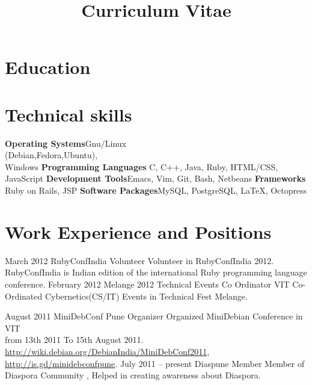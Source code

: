 \documentclass[11pt,a4paper]{moderncv}
\title{Curriculum Vitae}
\begin{document}
\maketitle

\section{Education}

\section{Technical skills}
\cvcomputer
{\textbf{Operating Systems}}{Gnu/Linux
\\(Debian,Fedora,Ubuntu), \\Windows}
{\textbf{Programming Languages}}{ C, C++, Java, Ruby, HTML/CSS, JavaScript }
\cvcomputer
{\textbf{Development Tools}}{Emacs, Vim, Git, Bash, Netbeans}
{\textbf{Frameworks}}{ Ruby on Rails, JSP}
\cvcomputer
{\textbf{Software Packages}}{MySQL, PostgreSQL, LaTeX, Octopress}
{}{}


\section{Work Experience and Positions}

\cventry    
            {March 2012}
            {RubyConfIndia}
            {Volunteer}
            {}
            {}
            {
              Volunteer in RubyConfIndia 2012. \\ 
              RubyConfIndia is Indian edition of the international
              Ruby programming language conference. 
            }
\cventry
            {February 2012}
            {Melange 2012 Technical Events }
            {Co Ordinator}
            {VIT}
            {}
            {
             Co-Ordinated Cybernetics(CS/IT) Events in Technical Fest
             Melange.
            } 

\cventry
            {August 2011}
            {MiniDebConf Pune}
            {Organizer}
            {}
            {}
            {
             Organized MiniDebian Conference in VIT \\
             from 13th 2011 To 15th August 2011.    \\
             \url{http://wiki.debian.org/DebianIndia/MiniDebConf2011}, \\
             \url{http://is.gd/minidebconfpune}.
           }
\cventry
           {July 2011 -- present}
           {Diaspune}
           {Member}
           {}
           {}
           {
            Member of Diaspora Community , Helped in creating
            awareness about Diaspora. 
           }\\\\\\\\\\
\end{document}
